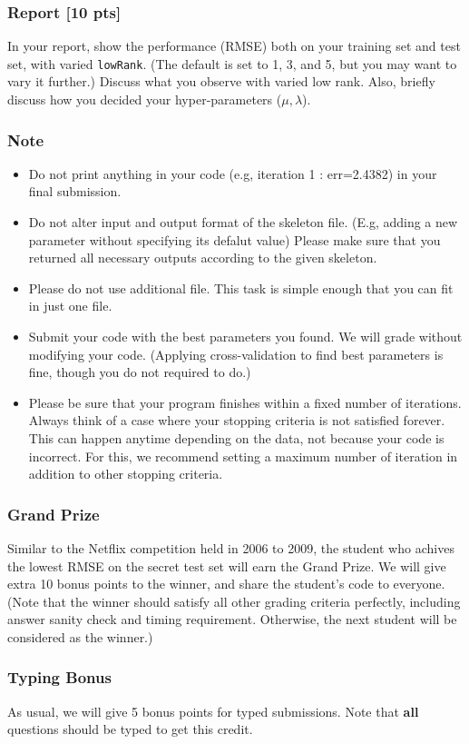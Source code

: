 \documentclass[twoside,10pt]{article}
\begin{document}
\subsubsection*{Report [10 pts]}
In your report, show the performance (RMSE) both on your training
set and test set, with varied \texttt{lowRank}. (The default is set
to 1, 3, and 5, but you may want to vary it further.) Discuss what
you observe with varied low rank. Also, briefly discuss how you
decided your hyper-parameters ($\mu, \lambda$).

\subsubsection*{Note}
\begin{itemize}
  \item Do not print anything in your code (e.g, iteration 1 :
  err=2.4382) in your final submission.
  \item Do not alter input and output format of the skeleton file. (E.g, adding a new parameter without specifying its defalut value) Please make sure that you returned all necessary outputs according to the given skeleton.
  \item Please do not use additional file. This task is simple enough that you can fit in just one file.
  \item Submit your code with the best parameters you found. We will grade without
modifying your code. (Applying cross-validation to find best
parameters is fine, though you do not required to do.)
  \item Please be sure that your program finishes within a fixed number of
iterations. Always think of a case where your stopping criteria is
not satisfied forever. This can happen anytime depending on the
data, not because your code is incorrect. For this, we recommend
setting a maximum number of iteration in addition to other stopping
criteria.
\end{itemize}

\subsubsection*{Grand Prize}

Similar to the Netflix competition held in 2006 to 2009, the student who achives the lowest RMSE on the secret test set will earn the Grand Prize. We will give extra 10 bonus points to the winner, and share the student's code to everyone. (Note that the winner should satisfy all other grading criteria perfectly, including answer sanity check and timing requirement. Otherwise, the next student will be considered as the winner.)

\subsubsection*{Typing Bonus}

As usual, we will give 5 bonus points for typed submissions. Note that \textbf{all} questions should be typed to get this credit.

%
%
\end{document}
